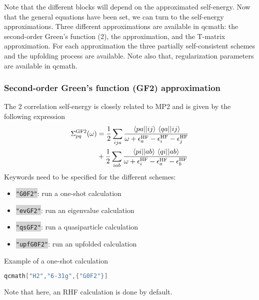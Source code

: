 \documentclass[aip,jcp,reprint,noshowkeys,superscriptaddress]{revtex4-1}
\newcommand{\GW}{\text{$GW$}}
\newcommand{\GFtwo}{\text{GF}2}
\newcommand{\GF}{\text{GF}}
\newcommand{\HF}{\text{HF}}
\newcommand{\ep}{\epsilon}
\newcommand{\Sigm}{\Sigma}
\newcommand{\ERI}[2]{\mel{#1}{}{#2}}
\newcommand{\keyword}[1]{{\colorbox{lightgray}{\texttt{#1}}}}
\begin{document}
Note that the different blocks will depend on the approximated self-energy. Now that the general equations have been set, we can turn to the self-energy approximations. Three different approximations are available in qcmath: the second-order Green's function (\GFtwo), the {\GW} approximation, and the T-matrix approximation. For each approximation the three partially self-consistent schemes and the upfolding process are available. Note also that, regularization parameters are available in qcmath.
 
\subsubsection*{Second-order Green's function (GF2) approximation}
The {\GFtwo} correlation self-energy is closely related to MP2 and is given by the following expression
\begin{equation}
\label{eq:SigCGF2}
\begin{split}
	\Sigm_{pq}^{\GF2}(\omega) 
	& = \frac{1}{2}\sum_{ija} \frac{\ERI{pa}{ij} \ERI{qa}{ij}}{\omega + \ep_{a}^{\HF} - \ep_{i}^{\HF} - \ep_{j}^{\HF}}
	\\
	& + \frac{1}{2}\sum_{iab} \frac{\ERI{pi}{ab} \ERI{qi}{ab}}{\omega + \ep_{i}^{\HF} - \ep_{a}^{\HF} - \ep_{b}^{\HF}}
\end{split}
\end{equation}
Keywords need to be specified for the different schemes: 
\begin{itemize}
\item \keyword{"G0F2"}: run a one-shot calculation
\item \keyword{"evGF2"}: run an eigenvalue calculation 
\item \keyword{"qsGF2"}: run a quasiparticle calculation 
\item \keyword{"upfG0F2"}: run an upfolded calculation
\end{itemize}

Example of a one-shot calculation
\begin{lstlisting}[extendedchars=true,language=Mathematica]
qcmath["H2","6-31g",{"G0F2"}]
\end{lstlisting}
Note that here, an RHF calculation is done by default.
\end{document}
